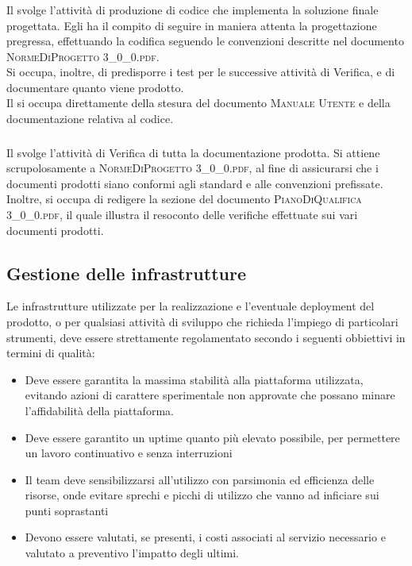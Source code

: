 		\subsubsection{\Progr}
		Il \textit{\Progr} svolge l'attività di produzione di codice che implementa la soluzione finale progettata. Egli ha il compito di seguire in maniera attenta la progettazione pregressa, effettuando la codifica seguendo le convenzioni descritte nel documento \textsc{NormeDiProgetto 3\_0\_0.pdf}.\\
		Si occupa, inoltre, di predisporre i test per le successive attività di Verifica, e di documentare quanto viene prodotto.\\
		Il \textit{\Progr} si occupa direttamente della stesura del documento \textsc{Manuale Utente} e della documentazione relativa al codice.
		
		\subsubsection{\Ver}
		Il \textit{\Ver} svolge l'attività di Verifica di tutta la documentazione prodotta. Si attiene scrupolosamente a \textsc{NormeDiProgetto 3\_0\_0.pdf}, al fine di assicurarsi che i documenti prodotti siano conformi agli standard e alle convenzioni prefissate.\\
		Inoltre, si occupa di redigere la sezione del documento \textsc{PianoDiQualifica 3\_0\_0.pdf}, il quale illustra il resoconto delle verifiche effettuate sui vari documenti prodotti.

	\newpage
	\subsection{Gestione delle infrastrutture}
	Le infrastrutture utilizzate per la realizzazione e l'eventuale deployment del prodotto, o per qualsiasi attività di sviluppo che richieda l'impiego di particolari strumenti, deve essere strettamente regolamentato secondo i seguenti obbiettivi in termini di qualità:
	
	\begin{itemize}
		\item Deve essere garantita la massima stabilità alla piattaforma utilizzata, evitando azioni di carattere sperimentale non approvate che possano minare l'affidabilità della piattaforma.
		\item Deve essere garantito un uptime quanto più elevato possibile, per permettere un lavoro continuativo e senza interruzioni
		\item Il team deve sensibilizzarsi all'utilizzo con parsimonia ed efficienza delle risorse, onde evitare sprechi e picchi di utilizzo che vanno ad inficiare sui punti soprastanti
		\item Devono essere valutati, se presenti, i costi associati al servizio necessario e valutato a preventivo l'impatto degli ultimi.
	\end{itemize}

